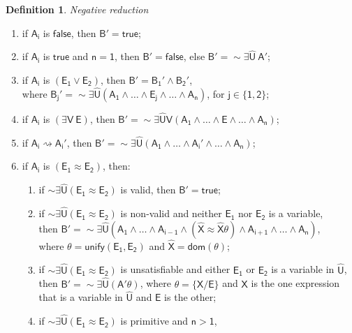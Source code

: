 \documentclass[inscr,ack,preface]{dithesis}
\theoremstyle{definition}
\newtheorem{definition}{Definition}[]
\newcommand{\msf}[1]{$\mathsf{#1}$}
\begin{document}
\begin{definition}{\emph{Negative reduction}}
\begin{enumerate}
  \item if \msf{A_i} is \msf{false}, then \msf{B' = true};
  \item if \msf{A_i} is \msf{true} and \msf{n = 1}, then \msf{B' = false},
        else \msf{B' = \sim \exists \widehat{U} ~ A'};
  \item if \msf{A_i} is \msf{\left( E_1 \lor E_2 \right)},
        then \msf{B' = B_1' \land B_2'}, \\ where \msf{B_j' = \sim \exists \widehat{U} \left( A_1 \land \dots \land E_j \land \dots \land A_n \right)}, for \msf{j \in \{ 1, 2 \}};
  \item if \msf{A_i} is \msf{\left( \exists V ~ E \right)},
        then \msf{B' = \sim \exists \widehat{U} V \left( A_1 \land \dots \land E \land \dots \land A_n \right)};
  \item if \msf{A_i \rightsquigarrow A_i'},
        then \msf{B' = \sim \exists \widehat{U} \left( A_1 \land \dots \land A_i' \land \dots \land A_n \right)};
  \item if \msf{A_i} is \msf{\left( E_1 \approx E_2 \right)}, then:
        \begin{enumerate}
          \item if \msf{\sim \exists \widehat{U} \left( E_1 \approx E_2 \right)}
                is valid, then \msf{B' = true};
          \item if \msf{\sim \exists \widehat{U} \left( E_1 \approx E_2 \right)}
                is non-valid and neither \msf{E_1} nor \msf{E_2} is a variable,
                \\then \msf{B' = \sim \exists \widehat{U} \left( A_1 \land \dots \land A_{i-1} \land \left( \widehat{X} \approx \widehat{X} \theta \right) \land A_{i+1} \land \dots \land A_n \right)},
                \\where \msf{\theta = unify \left( E_1, E_2 \right)} and \msf{\widehat{X} = dom\left( \theta \right)};
          \item if \msf{\sim \exists \widehat{U} \left( E_1 \approx E_2 \right)} is unsatisfiable and either \msf{E_1} or \msf{E_2} is a variable in \msf{\widehat{U}},
          \\then \msf{B' = \sim \exists \widehat{U} \left( A' \theta \right)}, where \msf{\theta = \{ X / E \}} and \msf{X} is the one expression that is a variable in \msf{\widehat{U}} and \msf{E} is the other;
          \item if \msf{\sim \exists \widehat{U} \left( E_1 \approx E_2 \right)}
                is primitive and \msf{n > 1}, \\

\end{enumerate}
\end{enumerate}
\end{definition}
\end{document}
